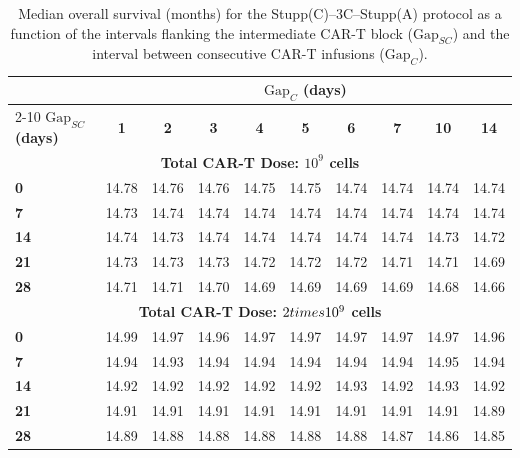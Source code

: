 \begin{table}[ht!]
    \caption{Median overall survival (months) for the Stupp(C)--3C--Stupp(A) protocol as a function of the intervals flanking the intermediate CAR-T block ($\mathrm{Gap}_{SC}$) and the interval between consecutive CAR-T infusions ($\mathrm{Gap}_{C}$).}
    \label{tab:StuppC-3C-StuppA-gaps4}
    \centering
    \begin{ruledtabular}
        \begin{tabular}{lccccccccc}
            & \multicolumn{9}{c}{\textbf{$\mathrm{Gap}_{C}$ (days)}} \\
            \cline{2-10}
            \textbf{$\mathrm{Gap}_{SC}$ (days)} & \textbf{1} & \textbf{2} & \textbf{3} & \textbf{4} & \textbf{5} & \textbf{6} & \textbf{7} & \textbf{10} & \textbf{14} \\
            \hline
            \multicolumn{10}{c}{\textbf{Total CAR-T Dose: $10^9$ cells}} \\
            \hline
            \textbf{0}   & 14.78 & 14.76 & 14.76 & 14.75 & 14.75 & 14.74 & 14.74 & 14.74 & 14.74 \\
            \textbf{7}   & 14.73 & 14.74 & 14.74 & 14.74 & 14.74 & 14.74 & 14.74 & 14.74 & 14.74 \\
            \textbf{14}  & 14.74 & 14.73 & 14.74 & 14.74 & 14.74 & 14.74 & 14.74 & 14.73 & 14.72 \\
            \textbf{21}  & 14.73 & 14.73 & 14.73 & 14.72 & 14.72 & 14.72 & 14.71 & 14.71 & 14.69 \\
            \textbf{28}  & 14.71 & 14.71 & 14.70 & 14.69 & 14.69 & 14.69 & 14.69 & 14.68 & 14.66 \\
            \hline
            \multicolumn{10}{c}{\textbf{Total CAR-T Dose: $2\\times10^9$ cells}} \\
            \hline
            \textbf{0}   & 14.99 & 14.97 & 14.96 & 14.97 & 14.97 & 14.97 & 14.97 & 14.97 & 14.96 \\
            \textbf{7}   & 14.94 & 14.93 & 14.94 & 14.94 & 14.94 & 14.94 & 14.94 & 14.95 & 14.94 \\
            \textbf{14}  & 14.92 & 14.92 & 14.92 & 14.92 & 14.92 & 14.93 & 14.92 & 14.93 & 14.92 \\
            \textbf{21}  & 14.91 & 14.91 & 14.91 & 14.91 & 14.91 & 14.91 & 14.91 & 14.91 & 14.89 \\
            \textbf{28}  & 14.89 & 14.88 & 14.88 & 14.88 & 14.88 & 14.88 & 14.87 & 14.86 & 14.85 \\
        \end{tabular}
    \end{ruledtabular}
\end{table}

